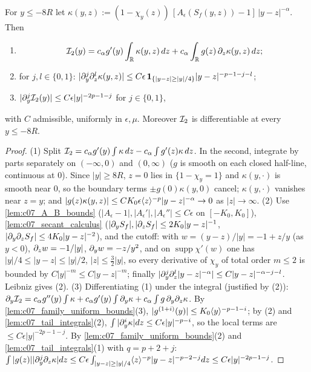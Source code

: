 \begin{lemma}
  \label{lem:c07_negative_I2}
  For $y\le-8R$ let $\kappa(y,z):=(1-\chi_y(z))\,[A_\epsilon(S_f(y,z))-1]\,|y-z|^{-\alpha}$. Then
  \begin{enumerate}
    \item \begin{equation}\label{eqn:approx_negative_Q_far_ibp}\mathcal{I}_2(y)=c_\alpha g'(y)\int_{\mathbb{R}}\kappa(y,z)\,dz+c_\alpha\int_{\mathbb{R}} g(z)\,\partial_z\kappa(y,z)\,dz;\end{equation}
    \item for $j,l\in\{0,1\}$: $|\partial_y^j\partial_z^l\kappa(y,z)|\le C\epsilon\,\mathbf 1_{\{|y-z|\ge|y|/4\}}|y-z|^{-p-1-j-l}$;
    \item $|\partial_y^j\mathcal{I}_2(y)|\le C\epsilon|y|^{-2p-1-j}$ for $j\in\{0,1\}$,
  \end{enumerate}
  with $C$ admissible, uniformly in $\epsilon,\mu$.
  Moreover $\mathcal{I}_2$ is differentiable at every $y\le-8R$.
\end{lemma}
\begin{proof}
  (1) Split $\mathcal{I}_2=c_\alpha g'(y)\int\kappa\,dz-c_\alpha\int g'(z)\kappa\,dz$. In the second, integrate by
  parts separately on $(-\infty,0)$ and $(0,\infty)$ ($g$ is smooth on each closed half-line, continuous
  at $0$). Since $|y|\ge8R$, $z=0$ lies in $\{1-\chi_y=1\}$ and $\kappa(y,\cdot)$ is smooth near $0$, so
  the boundary terms $\pm g(0)\kappa(y,0)$ cancel; $\kappa(y,\cdot)$ vanishes near $z=y$; and
  $|g(z)\kappa(y,z)|\le CK_0\epsilon\langle z \rangle^{-p}|y-z|^{-\alpha}\to0$ as $|z|\to\infty$.
  (2) Use \cref{lem:c07_A_B_bounds} ($|A_\epsilon-1|,|A_\epsilon'|,|A_\epsilon''|\le C\epsilon$ on $[-K_0,K_0]$),
  \cref{lem:c07_secant_calculus} ($|\partial_yS_f|,|\partial_zS_f|\le2K_0|y-z|^{-1}$, $|\partial_y\partial_zS_f|\le4K_0|y-z|^{-2}$), and
  the cutoff: with $w=(y-z)/|y|=-1+z/y$ (as $y<0$), $\partial_zw=-1/|y|$, $\partial_yw=-z/y^2$, and on
  $\operatorname{supp}\chi'(w)$ one has $|y|/4\le|y-z|\le|y|/2$, $|z|\le\frac32|y|$, so every derivative of
  $\chi_y$ of total order $m\le2$ is bounded by $C|y|^{-m}\le C|y-z|^{-m}$; finally
  $|\partial_y^j\partial_z^l|y-z|^{-\alpha}|\le C|y-z|^{-\alpha-j-l}$. Leibniz gives (2).
  (3) Differentiating (1) under the integral (justified by (2)):
  $\partial_y\mathcal{I}_2=c_\alpha g''(y)\int\kappa+c_\alpha g'(y)\int\partial_y\kappa+c_\alpha\int g\,\partial_y\partial_z\kappa$. By
  \cref{lem:c07_family_uniform_bounds}(3), $|g^{(1+i)}(y)|\le K_0\langle y \rangle^{-p-1-i}$; by (2) and
  \cref{lem:c07_tail_integrals}(2), $\int|\partial_y^i\kappa|dz\le C\epsilon|y|^{-p-i}$, so the local terms are
  $\le C\epsilon|y|^{-2p-1-j}$. By \cref{lem:c07_family_uniform_bounds}(2) and \cref{lem:c07_tail_integrals}(1)
  with $q=p+2+j$: $\int|g(z)||\partial_y^j\partial_z\kappa|dz\le C\epsilon\int_{|y-z|\ge|y|/4}\langle z \rangle^{-p}|y-z|^{-p-2-j}dz\le C\epsilon|y|^{-2p-1-j}$.
\end{proof}

